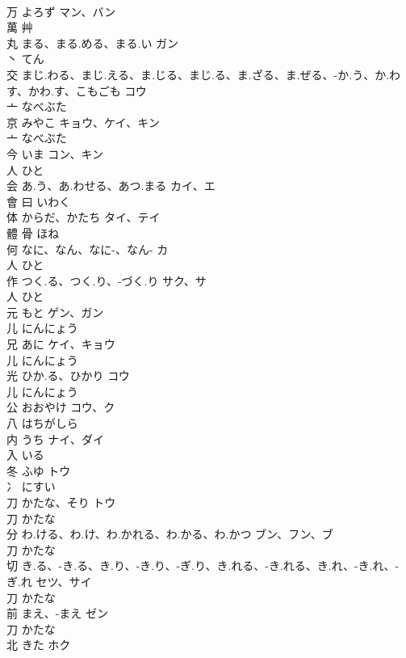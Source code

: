 \documentclass[8pt]{extreport}
\begin{document}
\begin{CJK}{UTF8}{min}
\\	万	よろず	マン、バン	
\\	萬	艸				
\\	丸	まる、まる.める、まる.い	ガン	
\\	丶		てん		
\\	交	まじ.わる、まじ.える、ま.じる、まじ.る、ま.ざる、ま.ぜる、-か.う、か.わす、かわ.す、こもごも	コウ	
\\	亠		なべぶた		
\\	京	みやこ	キョウ、ケイ、キン	
\\	亠		なべぶた		
\\	今	いま	コン、キン	
\\	人		ひと		
\\	会	あ.う、あ.わせる、あつ.まる	カイ、エ	
\\	會	曰		いわく		
\\	体	からだ、かたち	タイ、テイ	
\\	體	骨		ほね		
\\	何	なに、なん、なに-、なん-	カ	
\\	人		ひと		
\\	作	つく.る、つく.り、-づく.り	サク、サ	
\\	人		ひと		
\\	元	もと	ゲン、ガン	
\\	儿		にんにょう		
\\	兄	あに	ケイ、キョウ	
\\	儿		にんにょう		
\\	光	ひか.る、ひかり	コウ	
\\	儿		にんにょう		
\\	公	おおやけ	コウ、ク	
\\	八		はちがしら		
\\	内	うち	ナイ、ダイ	
\\	入		いる		
\\	冬	ふゆ	トウ	
\\	冫		にすい		
\\	刀	かたな、そり	トウ	
\\	刀		かたな		
\\	分	わ.ける、わ.け、わ.かれる、わ.かる、わ.かつ	ブン、フン、ブ	
\\	刀		かたな		
\\	切	き.る、-き.る、き.り、-き.り、-ぎ.り、き.れる、-き.れる、き.れ、-き.れ、-ぎ.れ	セツ、サイ	
\\	刀		かたな		
\\	前	まえ、-まえ	ゼン	
\\	刀		かたな		
\\	北	きた	ホク	

\end{CJK}
\end{document}
